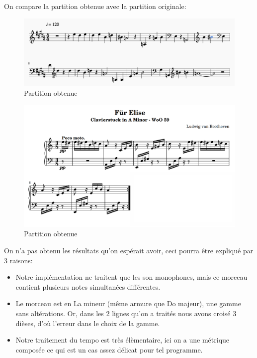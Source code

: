 \documentclass[]{article}
\providecommand{\tightlist}{%
  \setlength{\itemsep}{0pt}\setlength{\parskip}{0pt}}
\begin{document}
On compare la partition obtenue avec la partition originale:

\begin{figure}
\centering
\includegraphics{img/fur_elise_midi.png}
\caption{Partition obtenue}
\end{figure}

\begin{figure}
\centering
\includegraphics{img/fur_elise_partition.png}
\caption{Partition obtenue}
\end{figure}

On n'a pas obtenu les résultats qu'on espérait avoir, ceci pourra être
expliqué par 3 raisons:

\begin{itemize}
\tightlist
\item
  Notre implémentation ne traitent que les son monophones, mais ce
  morceau contient plusieurs notes simultanées différentes.
\item
  Le morceau est en La mineur (même armure que Do majeur), une gamme
  sans altérations. Or, dans les 2 lignes qu'on a traités nous avons
  croisé 3 dièses, d'où l'erreur dans le choix de la gamme.
\item
  Notre traitement du tempo est très élèmentaire, ici on a une métrique
  composée ce qui est un cas assez délicat pour tel programme.
\end{itemize}
\end{document}
